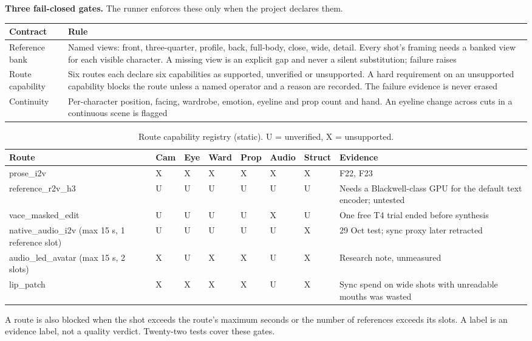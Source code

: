 \documentclass[11pt,a4paper]{article}
\begin{document}
\textbf{Three fail-closed gates.} The runner enforces these only when the project declares them.
\begin{longtable}{@{}P{2.6cm}P{12.9cm}@{}}
\toprule \textbf{Contract} & \textbf{Rule}\\ \midrule\endhead
Reference bank & Named views: front, three-quarter, profile, back, full-body, close, wide, detail. Every shot's framing needs a banked view for each visible character. A missing view is an explicit gap and never a silent substitution; failure raises\\
Route capability & Six routes each declare six capabilities as supported, unverified or unsupported. A hard requirement on an unsupported capability blocks the route unless a named operator and a reason are recorded. The failure evidence is never erased\\
Continuity & Per-character position, facing, wardrobe, emotion, eyeline and prop count and hand. An eyeline change across cuts in a continuous scene is flagged\\
\bottomrule
\end{longtable}
\begin{longtable}{@{}P{3.3cm}P{1.3cm}P{1.3cm}P{1.4cm}P{1.3cm}P{1.4cm}P{1.4cm}P{3.0cm}@{}}
\caption{Route capability registry (static). U = unverified, X = unsupported.}\\
\toprule \textbf{Route} & \textbf{Cam} & \textbf{Eye} & \textbf{Ward} & \textbf{Prop} & \textbf{Audio} & \textbf{Struct} & \textbf{Evidence}\\ \midrule\endhead
prose\_i2v & X & X & X & X & X & X & F22, F23\\
reference\_r2v\_h3 & U & U & U & U & U & U & Needs a Blackwell-class GPU for the default text encoder; untested\\
vace\_masked\_edit & U & U & U & U & X & U & One free T4 trial ended before synthesis\\
native\_audio\_i2v (max 15 s, 1 reference slot) & U & U & U & U & U & X & 29 Oct test; sync proxy later retracted\\
audio\_led\_avatar (max 15 s, 2 slots) & X & U & X & X & U & X & Research note, unmeasured\\
lip\_patch & X & X & X & X & U & X & Sync spend on wide shots with unreadable mouths was wasted\\
\bottomrule
\end{longtable}
A route is also blocked when the shot exceeds the route's maximum seconds or the number of references exceeds its slots. A label is an evidence label, not a quality verdict. Twenty-two tests cover these gates.
\end{document}
